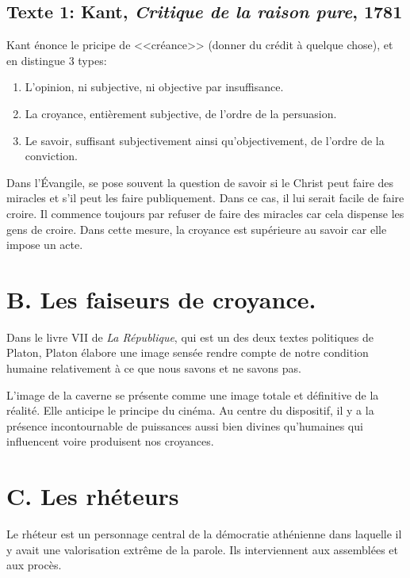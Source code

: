 \documentclass[12pt]{article}
\begin{document}
\subsection*{Texte 1: Kant, \emph{Critique de la raison pure}, 1781}
Kant énonce le pricipe de <<créance>> (donner du crédit à quelque chose), et en distingue 3 types:
\begin{enumerate}
    \item L'opinion, ni subjective, ni objective par insuffisance.
    \item La croyance, entièrement subjective, de l'ordre de la persuasion.
    \item Le savoir, suffisant subjectivement ainsi qu'objectivement, de l'ordre de la conviction.
\end{enumerate}
Dans l'Évangile, se pose souvent la question de savoir si le Christ peut faire des miracles et s'il peut les faire publiquement.
Dans ce cas, il lui serait facile de faire croire.
Il commence toujours par refuser de faire des miracles car cela dispense les gens de croire.
Dans cette mesure, la croyance est supérieure au savoir car elle impose un acte.

\section*{\color{red}B. Les faiseurs de croyance.}
Dans le livre VII de \emph{La République}, qui est un des deux textes politiques de Platon, Platon élabore une image sensée rendre compte de notre condition humaine relativement à ce que nous savons et ne savons pas.\par
L'image de la caverne se présente comme une image totale et définitive de la réalité.
Elle anticipe le principe du cinéma.
Au centre du dispositif, il y a la présence incontournable de puissances aussi bien divines qu'humaines qui influencent voire produisent nos croyances.

\section*{\color{red}C. Les rhéteurs}
Le rhéteur est un personnage central de la démocratie athénienne dans laquelle il y avait une valorisation extrême de la parole.
Ils interviennent aux assemblées et aux procès.
\end{document}
